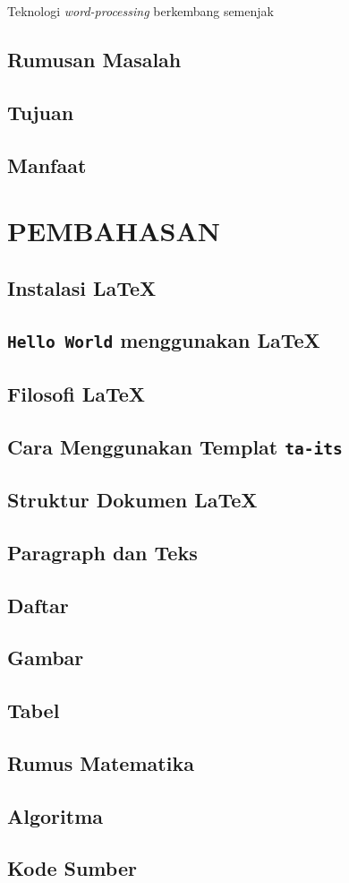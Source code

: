 \documentclass{ta-its}
\begin{document}
            Teknologi \emph{word-processing} berkembang semenjak 
        \section{Rumusan Masalah}
        \section{Tujuan}
        \section{Manfaat}
    
    \chapter{PEMBAHASAN}
        \section{Instalasi \LaTeX{}}
        \section{\texttt{Hello World} menggunakan \LaTeX{}}
        \section{Filosofi \LaTeX{}}
        \section{Cara Menggunakan Templat \texttt{ta-its}}
        \section{Struktur Dokumen \LaTeX{}}
        \section{Paragraph dan Teks}
        \section{Daftar}
        \section{Gambar}
        \section{Tabel}
        \section{Rumus Matematika}
        \section{Algoritma}
        \section{Kode Sumber}
        

\appendix %

\backmatter %
\end{document}
